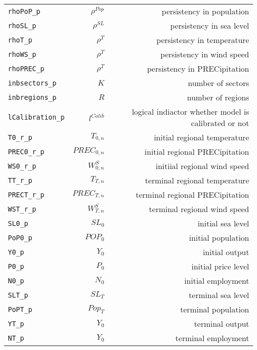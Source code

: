 \begin{center}
\begin{longtable}{lrr}
\texttt{rhoPoP\_p} & ${\rho^{Pop}}$ & persistency in population\\
\texttt{rhoSL\_p} & ${\rho^{SL}}$ & persistency in sea level\\
\texttt{rhoT\_p} & ${\rho^{T}}$ & persistency in temperature\\
\texttt{rhoWS\_p} & ${\rho^{T}}$ & persistency in wind speed\\
\texttt{rhoPREC\_p} & ${\rho^{T}}$ & persistency in PRECipitation\\
\texttt{inbsectors\_p} & ${K}$ & number of sectors\\
\texttt{inbregions\_p} & ${R}$ & number of regions\\
\texttt{lCalibration\_p} & ${l^{Calib}}$ & logical indiactor whether model is calibrated or not\\
\texttt{T0\_r\_p} & ${T_{0,n}}$ & initial regional temperature\\
\texttt{PREC0\_r\_p} & ${PREC_{0,n}}$ & initial regional PRECipitation\\
\texttt{WS0\_r\_p} & ${W^{S}_{0,n}}$ & initiial regional wind speed\\
\texttt{TT\_r\_p} & ${T_{T,n}}$ & terminal regional temperature\\
\texttt{PRECT\_r\_p} & ${PREC_{T,n}}$ & terminal regional PRECipitation\\
\texttt{WST\_r\_p} & ${W^{S}_{T,n}}$ & terminal regional wind speed\\
\texttt{SL0\_p} & ${SL_0}$ & initial sea level\\
\texttt{PoP0\_p} & ${POP_0}$ & initial population\\
\texttt{Y0\_p} & ${Y_0}$ & initial output\\
\texttt{P0\_p} & ${P_0}$ & initial price level\\
\texttt{N0\_p} & ${N_0}$ & initial employment\\
\texttt{SLT\_p} & ${SL_T}$ & terminal sea level\\
\texttt{PoPT\_p} & ${Pop_T}$ & terminal population\\
\texttt{YT\_p} & ${Y_0}$ & terminal output\\
\texttt{NT\_p} & ${Y_0}$ & terminal employment\\
\hline%
\end{longtable}
\end{center}
